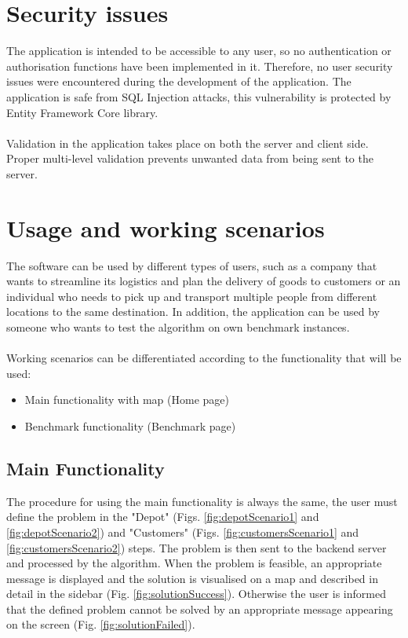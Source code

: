 \documentclass[a4paper,twoside,12pt]{book}
\begin{document}
\section{Security issues}
The application is intended to be accessible to any user, so no authentication or authorisation functions have been implemented in it. Therefore, no user security issues were encountered during the development of the application. The application is safe from SQL Injection attacks, this vulnerability is protected by Entity Framework Core library.
\paragraph{}
Validation in the application takes place on both the server and client side. Proper multi-level validation prevents unwanted data from being sent to the server.

\section{Usage and working scenarios}
The software can be used by different types of users, such as a company that wants to streamline its logistics and plan the delivery of goods to customers or an individual who needs to pick up and transport multiple people from different locations to the same destination. In addition, the application can be used by someone who wants to test the algorithm on own benchmark instances.
\paragraph{}
Working scenarios can be differentiated according to the functionality that will be used:

\begin{itemize}
    \item Main functionality with map (Home page)
    \item Benchmark functionality (Benchmark page)
\end{itemize}

\subsection{Main Functionality}
The procedure for using the main functionality is always the same, the user must define the problem in the "Depot" (Figs. \ref{fig:depotScenario1} and \ref{fig:depotScenario2}) and "Customers" (Figs. \ref{fig:customersScenario1} and \ref{fig:customersScenario2}) steps. The problem is then sent to the backend server and processed by the algorithm. When the problem is feasible, an appropriate message is displayed and the solution is visualised on a map and described in detail in the sidebar (Fig. \ref{fig:solutionSuccess}). Otherwise the user is informed that the defined problem cannot be solved by an appropriate message appearing on the screen (Fig. \ref{fig:solutionFailed}). 
\end{document}
